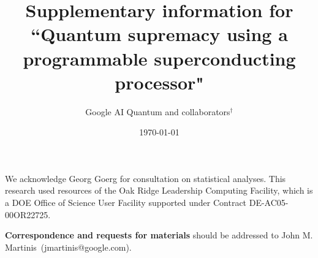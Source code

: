 \documentclass[%
 reprint,
superscriptaddress,
 amsmath,amssymb,
 pra,
]{revtex4-2}
\begin{document}
\title{Supplementary information for\\ 
``Quantum supremacy using a programmable superconducting processor" \cite{arute2019}}

%
\author{Google AI Quantum and collaborators$^\dagger$}

\date{\today}


\maketitle

\tableofcontents













\begin{acknowledgments}
We acknowledge Georg Goerg for consultation on statistical analyses. This research used resources of the Oak Ridge Leadership Computing Facility, which is a DOE Office of Science User Facility supported under Contract DE-AC05-00OR22725.
\end{acknowledgments}

\vspace{1mm}
\textbf{Correspondence and requests for materials}
\small{should be addressed to John M. Martinis~(jmartinis@google.com).}
\end{document}
